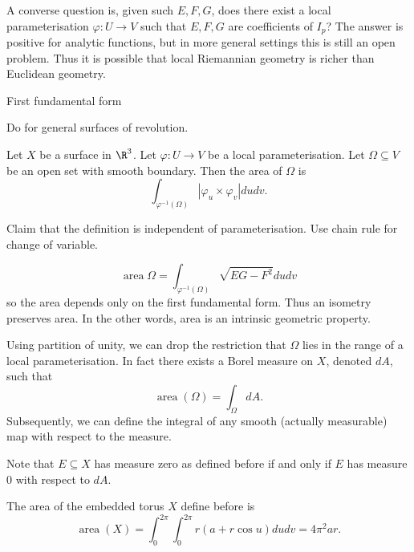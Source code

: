 \documentclass[a4paper]{article}
\begin{document}
A converse question is, given such \(E, F, G\), does there exist a local parameterisation \(\varphi: U \to V\) such that \(E, F, G\) are coefficients of \(I_p\)? The answer is positive for analytic functions, but in more general settings this is still an open problem. Thus it is possible that local Riemannian geometry is richer than Euclidean geometry.


First fundamental form

\begin{eg}
  
\end{eg}

\begin{ex}
  Do for general surfaces of revolution.
\end{ex}

\begin{definition}
  Let \(X\) be a surface in \(\R^3\). Let \(\varphi: U \to V\) be a local parameterisation. Let \(\Omega \subseteq V\) be an open set with smooth boundary. Then the area of \(\Omega\) is
  \[
    \int_{\varphi^{-1}(\Omega)} |\varphi_u \times \varphi_v| dudv.
  \]
\end{definition}

Claim that the definition is independent of parameterisation. Use chain rule for change of variable.

\begin{ex}
  \[
    \operatorname{area} \Omega = \int_{\varphi^{-1}(\Omega)} \sqrt{EG - F^2} dudv
  \]
  so the area depends only on the first fundamental form. Thus an isometry preserves area. In the other words, area is an intrinsic geometric property.
\end{ex}

\begin{remark}
  Using partition of unity, we can drop the restriction that \(\Omega\) lies in the range of a local parameterisation. In fact there exists a Borel measure on \(X\), denoted \(dA\), such that
  \[
    \operatorname{area} (\Omega) = \int_\Omega dA.
  \]
  Subsequently, we can define the integral of any smooth (actually measurable) map with respect to the measure.

  Note that \(E \subseteq X\) has measure zero as defined before if and only if \(E\) has measure \(0\) with respect to \(dA\).
\end{remark}

\begin{eg}
  The area of the embedded torus \(X\) define before is
  \[
    \operatorname{area}(X)
    = \int_0^{2\pi}\int_0^{2\pi} r(a + r\cos u) dudv
    = 4\pi^2 a r.
  \]
\end{eg}
\end{document}
